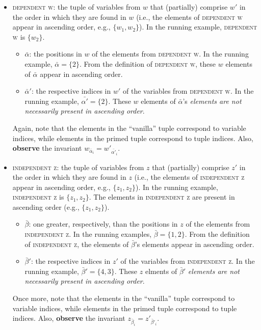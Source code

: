 \documentclass{article}
\newcommand{\1}{(\textos{1})\!}
\newcommand{\2}{(\textos{2})\!}
\newcommand{\3}{(\textos{3})\!}
\newcommand{\4}{(\textos{4})\!}
\newcommand{\5}{(\textos{5})\!}
\newcommand{\6}{(\textos{6})\!}
\newcommand{\7}{(\textos{7})\!}
\newcommand{\8}{(\textos{8})\!}
\begin{document}
\begin{itemize}
	\item \textsc{dependent w}: the tuple of variables from $w$ that (partially) comprise $w'$ in the order in which they are found in $w$ (i.e., the elements of \textsc{dependent w} appear in ascending order, e.g., $\{ w_1, w_2 \}$). In the running example, \textsc{dependent w} is $\{ w_2 \}$.
		\begin{itemize}
			\item $\bar{\alpha}$: the positions in $w$ of the elements from \textsc{dependent w}. In the running example, $\bar{\alpha} = \{ 2 \}$. From the definition of \textsc{dependent w}, these $w$ elements of $\bar{\alpha}$ appear in ascending order.
			\item $\bar{\alpha}'$: the respective indices in $w'$ of the variables from \textsc{dependent w}. In the running example, $\bar{\alpha'} = \{ 2 \}$. These $w$ elements of $\bar{\alpha}$'s \emph{elements are not necessarily present in ascending order}.
		\end{itemize}
		Again, note that the elements in the ``vanilla'' tuple correspond to variable indices, while elements in the primed tuple correspond to tuple indices. Also, \textbf{observe} the invariant $w_{\bar{\alpha}_i} = w'_{\bar{\alpha'}_i}$.
	\item \textsc{independent z}: the tuple of variables from $z$ that (partially) comprise $z'$ in the order in which they are found in $z$ (i.e., the elements of \textsc{independent z} appear in ascending order, e.g., $\{ z_1, z_2 \}$). In the running example, \textsc{independent z} is $\{ z_1, z_2 \}$. The elements in \textsc{independent z} are present in ascending order (e.g., $\{ z_1, z_2 \}$).
		\begin{itemize}
			\item $\bar{\beta}$: one greater, respectively, than the positions in $z$ of the elements from \textsc{independent z}. In the running examples, $\bar{\beta} = \{1, 2 \}$. From the definition of \textsc{independent z}, the elements of $\bar{\beta}$'s elements appear in ascending order.
			\item $\bar{\beta}'$: the respective indices in $z'$ of the variables from \textsc{independent z}. In the running example, $\bar{\beta}' = \{4, 3 \}$. These $z$ elments of $\bar{\beta}'$ \emph{elements are not necessarily present in ascending order}.
		\end{itemize}
		Once more, note that the elements in the ``vanilla'' tuple correspond to variable indices, while elements in the primed tuple correspond to tuple indices. Also, \textbf{observe} the invariant $z_{\bar{\beta}_i} = z'_{\bar{\beta}'_i}$.
\end{itemize}
\end{document}
